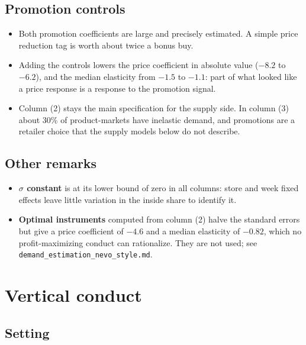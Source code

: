 \documentclass[11pt]{article}
\newcommand{\code}[1]{\texttt{#1}}
\begin{document}
\subsection{Promotion controls}

\begin{itemize}
  \item Both promotion coefficients are large and precisely estimated. A simple price
        reduction tag is worth about twice a bonus buy.
  \item Adding the controls lowers the price coefficient in absolute value ($-8.2$ to
        $-6.2$), and the median elasticity from $-1.5$ to $-1.1$: part of what looked like a
        price response is a response to the promotion signal.
  \item Column (2) stays the main specification for the supply side. In column (3) about
        30\% of product-markets have inelastic demand, and promotions are a retailer choice
        that the supply models below do not describe.
\end{itemize}

\subsection{Other remarks}

\begin{itemize}
  \item \textbf{$\sigma$ constant} is at its lower bound of zero in all columns: store and
        week fixed effects leave little variation in the inside share to identify it.
  \item \textbf{Optimal instruments} \citep{chamberlain1987,reynaert2014} computed from
        column (2) halve the standard errors but give a price coefficient of $-4.6$ and a
        median elasticity of $-0.82$, which no profit-maximizing conduct can rationalize.
        They are not used; see \code{demand\_estimation\_nevo\_style.md}.
\end{itemize}

\section{Vertical conduct}\label{sec:conduct}

\subsection{Setting}
\end{document}
